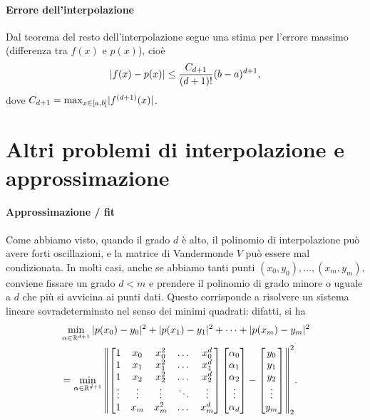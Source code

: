 \documentclass[a4paper]{report}
\DeclarePairedDelimiter{\abs}{\lvert}{\rvert}
\DeclarePairedDelimiter{\norm}{\lVert}{\rVert}
\theoremstyle{definition}
\theoremstyle{remark}
\begin{document}
\paragraph{Errore dell'interpolazione} Dal teorema del resto dell'interpolazione segue una stima per l'errore massimo (differenza tra $f(x)$ e $p(x)$), cioè
\[
\abs{f(x) - p(x)} \leq \frac{C_{d+1}}{(d+1)!}(b-a)^{d+1},
\]
dove $C_{d+1} = \max_{x\in [a,b]} \abs{f^{(d+1)}(x)}$.

\section{Altri problemi di interpolazione e approssimazione}

\paragraph{Approssimazione / fit} Come abbiamo visto, quando il grado $d$ è alto, il polinomio di interpolazione può avere forti oscillazioni, e la matrice di Vandermonde $V$ può essere mal condizionata. In molti casi, anche se abbiamo tanti punti $(x_0,y_0), \dots, (x_m,y_m)$, conviene fissare un grado $d<m$ e prendere il polinomio di grado minore o uguale a $d$ che più si avvicina ai punti dati. Questo corrisponde a risolvere un sistema lineare sovradeterminato nel senso dei minimi quadrati: difatti, si ha
\begin{align*}
&\min_{\alpha \in \mathbb{R}^{d+1}} \, \abs{p(x_0)-y_0}^2 + \abs{p(x_1)-y_1}^2 + \dots + \abs{p(x_m)-y_m}^2\\
&= 
\min_{\alpha \in \mathbb{R}^{d+1}}\, \norm*{\begin{bmatrix}
    1 & x_0 & x_0^2 & \dots & x_0^d\\
    1 & x_1 & x_1^2 & \dots & x_1^d\\
    1 & x_2 & x_2^2 & \dots & x_2^d\\
    \vdots & \vdots & \vdots & \ddots & \vdots\\
    1 & x_m & x_m^2 & \dots & x_m^d\\
\end{bmatrix}
\begin{bmatrix}
    \alpha_0\\
    \alpha_1\\
    \alpha_2\\
    \vdots\\
    \alpha_d
\end{bmatrix} - \begin{bmatrix}
    y_0\\
    y_1\\
    y_2\\
    \vdots\\
    y_m
\end{bmatrix}
}_2^2.    
\end{align*}
\end{document}
